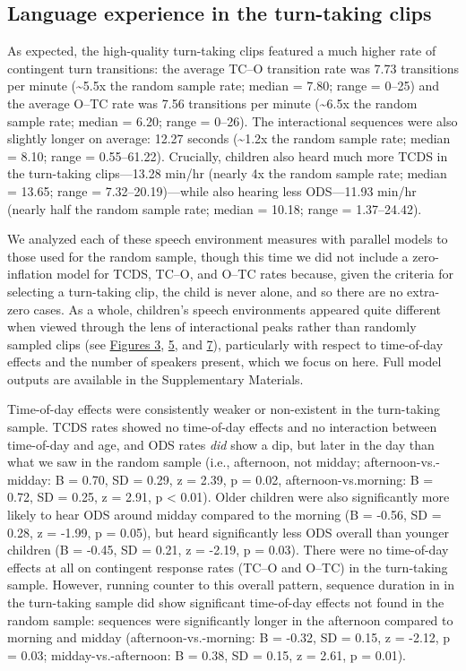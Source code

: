 \documentclass[floatsintext,man]{apa6}
\theoremstyle{definition}
\theoremstyle{definition}
\theoremstyle{definition}
\theoremstyle{remark}
\begin{document}
\subsection{Language experience in the turn-taking
clips}\label{language-experience-in-the-turn-taking-clips}

As expected, the high-quality turn-taking clips featured a much higher
rate of contingent turn transitions: the average TC--O transition rate
was 7.73 transitions per minute (\textasciitilde{}5.5x the random sample
rate; median = 7.80; range = 0--25) and the average O--TC rate was 7.56
transitions per minute (\textasciitilde{}6.5x the random sample rate;
median = 6.20; range = 0--26). The interactional sequences were also
slightly longer on average: 12.27 seconds (\textasciitilde{}1.2x the
random sample rate; median = 8.10; range = 0.55--61.22). Crucially,
children also heard much more TCDS in the turn-taking clips---13.28
min/hr (nearly 4x the random sample rate; median = 13.65; range =
7.32--20.19)---while also hearing less ODS---11.93 min/hr (nearly half
the random sample rate; median = 10.18; range = 1.37--24.42).

We analyzed each of these speech environment measures with parallel
models to those used for the random sample, though this time we did not
include a zero-inflation model for TCDS, TC--O, and O--TC rates because,
given the criteria for selecting a turn-taking clip, the child is never
alone, and so there are no extra-zero cases. As a whole, children's
speech environments appeared quite different when viewed through the
lens of interactional peaks rather than randomly sampled clips (see
\protect\hyperlink{fig3}{Figures 3}, \protect\hyperlink{fig5}{5}, and
\protect\hyperlink{fig7}{7}), particularly with respect to time-of-day
effects and the number of speakers present, which we focus on here. Full
model outputs are available in the Supplementary Materials.

Time-of-day effects were consistently weaker or non-existent in the
turn-taking sample. TCDS rates showed no time-of-day effects and no
interaction between time-of-day and age, and ODS rates \emph{did} show a
dip, but later in the day than what we saw in the random sample (i.e.,
afternoon, not midday; afternoon-vs.-midday: B = 0.70, SD = 0.29, z =
2.39, p = 0.02, afternoon-vs.morning: B = 0.72, SD = 0.25, z = 2.91, p
\textless{} 0.01). Older children were also significantly more likely to
hear ODS around midday compared to the morning (B = -0.56, SD = 0.28, z
= -1.99, p = 0.05), but heard significantly less ODS overall than
younger children (B = -0.45, SD = 0.21, z = -2.19, p = 0.03). There were
no time-of-day effects at all on contingent response rates (TC--O and
O--TC) in the turn-taking sample. However, running counter to this
overall pattern, sequence duration in in the turn-taking sample did show
significant time-of-day effects not found in the random sample:
sequences were significantly longer in the afternoon compared to morning
and midday (afternoon-vs.-morning: B = -0.32, SD = 0.15, z = -2.12, p =
0.03; midday-vs.-afternoon: B = 0.38, SD = 0.15, z = 2.61, p = 0.01).
\end{document}
